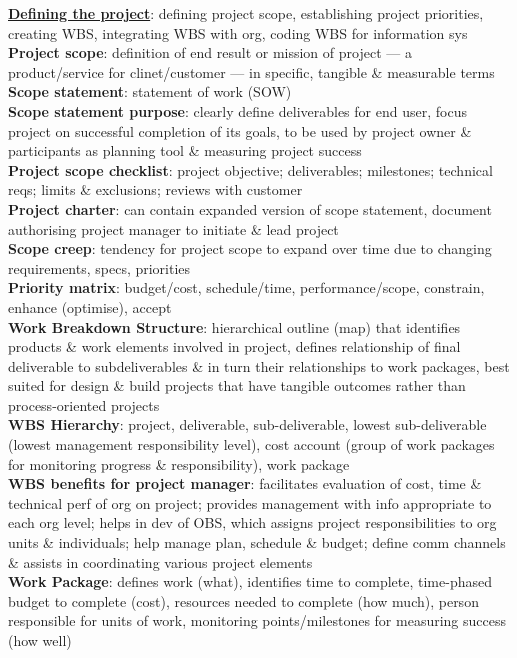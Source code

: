 \documentclass[a4paper]{article}
\begin{document}
\begin{multicols}{3}
        \underline{\textbf{Defining the project}}: defining project scope, establishing project priorities, creating WBS, integrating WBS with org, coding WBS for information sys\\
        \textbf{Project scope}: definition of end result or mission of project --- a product/service for clinet/customer --- in specific, tangible \& measurable terms\\
        \textbf{Scope statement}: statement of work (SOW)\\
        \textbf{Scope statement purpose}: clearly define deliverables for end user, focus project on successful completion of its goals, to be used by project owner \& participants as planning tool \& measuring project success\\
        \textbf{Project scope checklist}: project objective; deliverables; milestones; technical reqs; limits \& exclusions; reviews with customer\\
        \textbf{Project charter}: can contain expanded version of scope statement, document authorising project manager to initiate \& lead project\\
        \textbf{Scope creep}: tendency for project scope to expand over time due to changing requirements, specs, priorities\\
        \textbf{Priority matrix}: budget/cost, schedule/time, performance/scope, constrain, enhance (optimise), accept\\
        \textbf{Work Breakdown Structure}: hierarchical outline (map) that identifies products \& work elements involved in project, defines relationship of final deliverable to subdeliverables \& in turn their relationships to work packages, best suited for design \& build projects that have tangible outcomes rather than process-oriented projects\\
        \textbf{WBS Hierarchy}: project, deliverable, sub-deliverable, lowest sub-deliverable (lowest management responsibility level), cost account (group of work packages for monitoring progress \& responsibility), work package\\
        \textbf{WBS benefits for project manager}: facilitates evaluation of cost, time \& technical perf of org on project; provides management with info appropriate to each org level; helps in dev of OBS, which assigns project responsibilities to org units \& individuals; help manage plan, schedule \& budget; define comm channels \& assists in coordinating various project elements\\
        \textbf{Work Package}: defines work (what), identifies time to complete, time-phased budget to complete (cost), resources needed to complete (how much), person responsible for units of work, monitoring points/milestones for measuring success (how well)\\

\end{multicols}
\end{document}
